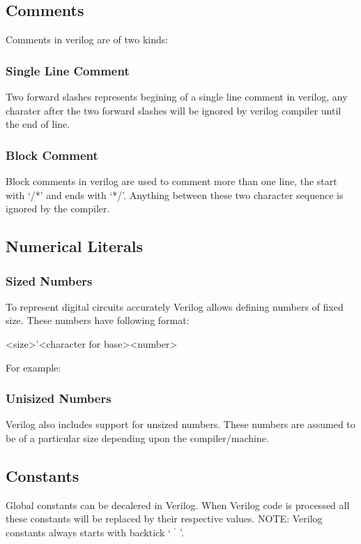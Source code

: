 \documentclass[a4paper,10pt]{article}
\theoremstyle{mytheor}
\newcommand{
  \insertverilog}[3]{
  
}
\begin{document}
\insertverilog{./verilog_files/AndGate3.v}{sample-module}{\text{Illustrative AND gate module}} 
\subsection*{Comments}
Comments in verilog are of two kinds:
\subsubsection*{Single Line Comment}
Two forward slashes represents begining of a single line comment in verilog, any charater after the two forward slashes will be ignored by verilog compiler until the end of line.
\insertverilog{./verilog_files/singleLineComment.v}{single-line-comment}{\text{Single line comment}} 

\subsubsection*{Block Comment}
Block comments in verilog are used to comment more than one line, the start with `/*' and ends with `*/'. Anything between these two character sequence is ignored by the compiler.
\insertverilog{./verilog_files/blockComment.v}{block-comment}{\text{Block
    comment}}

\subsection*{Numerical Literals}
\subsubsection*{Sized Numbers}
To represent digital circuits accurately Verilog allows defining
numbers of fixed size. These numbers have following format:
\begin{center}
  <size>'<character for base><number>
\end{center}

For example:
\insertverilog{./verilog_files/sizedNumbers.v}{sized-numbers}{\text{Example of sized numbers}}
 
\subsubsection*{Unisized Numbers}
Verilog also includes support for unsized numbers. These numbers are
assumed to be of a particular size depending upon the
compiler/machine.

\subsection*{Constants}
Global constants can be decalered in Verilog. When Verilog code is processed all these constants will be replaced by their respective values. NOTE: Verilog constants always starts with backtick ` ${}^{\backprime}$ '. 
\insertverilog{./verilog_files/constants.v}{constants}{\text{Declaration and use of constants}}
\end{document}
